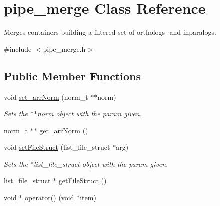 \hypertarget{classpipe__merge}{
\section{pipe\_\-merge Class Reference}
\label{classpipe__merge}
}


Merges containers building a filtered set of orthologs-\/ and inparalogs.  




{\ttfamily \#include $<$pipe\_\-merge.h$>$}

\subsection*{Public Member Functions}
\begin{DoxyCompactItemize}
\item 
\hypertarget{classpipe__merge_ac93add3e78024ca898bd5b97cf6da803}{
void \hyperlink{classpipe__merge_ac93add3e78024ca898bd5b97cf6da803}{set\_\-arrNorm} (norm\_\-t $\ast$$\ast$norm)}
\label{classpipe__merge_ac93add3e78024ca898bd5b97cf6da803}

\begin{DoxyCompactList}\small\item\em Sets the $\ast$$\ast$norm object with the param given. \end{DoxyCompactList}\item 
norm\_\-t $\ast$$\ast$ \hyperlink{classpipe__merge_a66e8a21f1a88493b83d64c5bb8b41195}{get\_\-arrNorm} ()
\item 
\hypertarget{classpipe__merge_a8978f6b7f998446900d37be3c2fdbe05}{
void \hyperlink{classpipe__merge_a8978f6b7f998446900d37be3c2fdbe05}{setFileStruct} (list\_\-file\_\-struct $\ast$arg)}
\label{classpipe__merge_a8978f6b7f998446900d37be3c2fdbe05}

\begin{DoxyCompactList}\small\item\em Sets the $\ast$list\_\-file\_\-struct object with the param given. \end{DoxyCompactList}\item 
list\_\-file\_\-struct $\ast$ \hyperlink{classpipe__merge_a6e79a016c137c40e1a35fe5630de83c1}{getFileStruct} ()
\item 
\hypertarget{classpipe__merge_aa950a63e7bf9e162881fd8ac5f796ec7}{
void $\ast$ \hyperlink{classpipe__merge_aa950a63e7bf9e162881fd8ac5f796ec7}{operator()} (void $\ast$item)}
\label{classpipe__merge_aa950a63e7bf9e162881fd8ac5f796ec7}


\end{DoxyCompactItemize}

